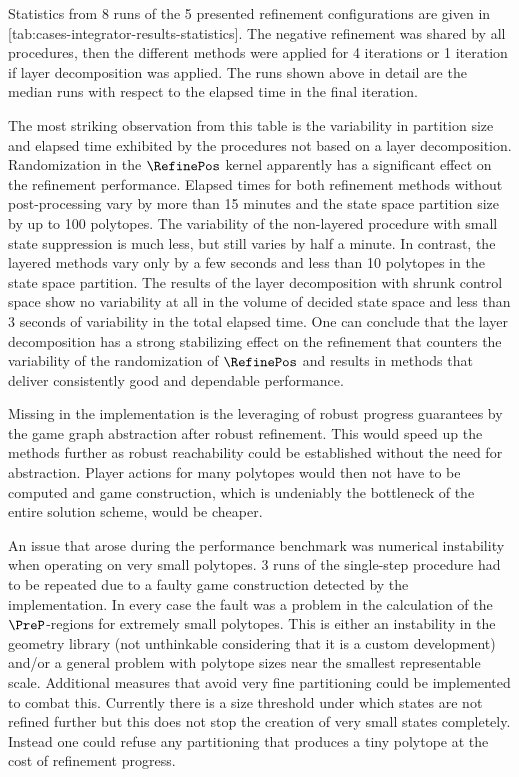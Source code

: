     Statistics from 8 runs of the 5 presented refinement configurations are given in [tab:cases-integrator-results-statistics].
    The negative refinement was shared by all procedures, then the different methods were applied for 4 iterations or 1 iteration if layer decomposition was applied.
    The runs shown above in detail are the median runs with respect to the elapsed time in the final iteration.

    The most striking observation from this table is the variability in partition size and elapsed time exhibited by the procedures not based on a layer decomposition.
    Randomization in the $\RefinePos$ kernel apparently has a significant effect on the refinement performance.
    Elapsed times for both refinement methods without post-processing vary by more than 15 minutes and the state space partition size by up to 100 polytopes.
    The variability of the non-layered procedure with small state suppression is much less, but still varies by half a minute.
    In contrast, the layered methods vary only by a few seconds and less than 10 polytopes in the state space partition.
    The results of the layer decomposition with shrunk control space show no variability at all in the volume of decided state space and less than 3 seconds of variability in the total elapsed time.
    One can conclude that the layer decomposition has a strong stabilizing effect on the refinement that counters the variability of the randomization of $\RefinePos$ and results in methods that deliver consistently good and dependable performance.

    Missing in the implementation is the leveraging of robust progress guarantees by the game graph abstraction after robust refinement.
    This would speed up the methods further as robust reachability could be established without the need for abstraction.
    Player actions for many polytopes would then not have to be computed and game construction, which is undeniably the bottleneck of the entire solution scheme, would be cheaper.

    An issue that arose during the performance benchmark was numerical instability when operating on very small polytopes.
    3 runs of the single-step procedure had to be repeated due to a faulty game construction detected by the implementation.
    In every case the fault was a problem in the calculation of the $\PreP$-regions for extremely small polytopes.
    This is either an instability in the geometry library (not unthinkable considering that it is a custom development) and/or a general problem with polytope sizes near the smallest representable scale.
    Additional measures that avoid very fine partitioning could be implemented to combat this.
    Currently there is a size threshold under which states are not refined further but this does not stop the creation of very small states completely.
    Instead one could refuse any partitioning that produces a tiny polytope at the cost of refinement progress.

